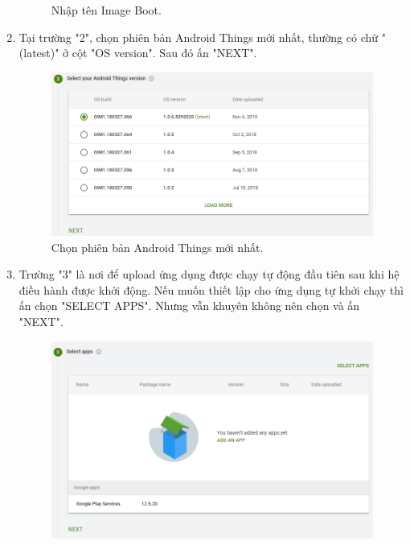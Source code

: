 \begin{enumerate}
\begin{center}
\begin{figure}[htp]
\begin{center}
\end{center}
\caption{Nhập tên Image Boot.}
\label{refhinh1}
\end{figure}
\end{center}
\item Tại trường "2", chọn phiên bản Android Things mới nhất, thường có chữ "(latest)" ở cột "OS version". Sau đó ấn "NEXT".
\begin{center}
\begin{figure}[htp]
\begin{center}
\includegraphics[scale=0.6]{image3/sat9.png}
\end{center}
\caption{Chọn phiên bản Android Things mới nhất.}
\label{refhinh1}
\end{figure}
\end{center}
\item Trường "3" là nơi để upload ứng dụng được chạy tự động đầu tiên sau khi hệ điều hành được khởi động. Nếu muốn thiết lập cho ứng dụng tự khởi chạy thì ấn chọn "SELECT APPS". Nhưng vẫn khuyên không nên chọn và ấn "NEXT".
\begin{center}
\begin{figure}[htp]
\begin{center}
\includegraphics[scale=0.5]{image3/sat10.png}

\end{center}
\end{figure}
\end{center}
\end{enumerate}
